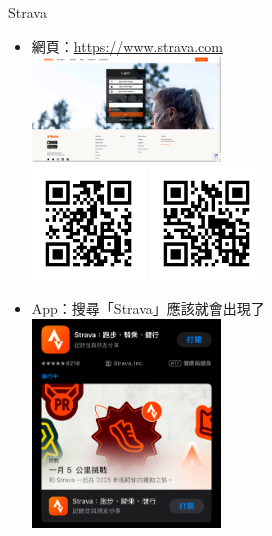 \begin{frame}{Strava}
\begin{multicols}{2}
\begin{itemize}
\item 網頁：\url{https://www.strava.com}\\
\includegraphics[width=5cm]{stravaWebsite.png}\\
\includegraphics[width=3cm]{rickroll.png}
\includegraphics[width=3cm]{QRcodeStrava.png}
\newpage
\item App：搜尋「Strava」應該就會出現了\\
\includegraphics[width=5cm]{stravaApp.png}
\end{itemize}
\end{multicols}
\end{frame}
